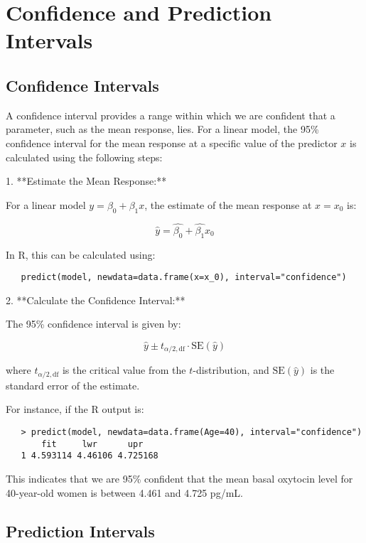 \documentclass{article}
\begin{document}
\section{Confidence and Prediction Intervals}

\subsection{Confidence Intervals}

A confidence interval provides a range within which we are confident that a parameter, such as the mean response, lies. For a linear model, the 95\% confidence interval for the mean response at a specific value of the predictor \(x\) is calculated using the following steps:

1. **Estimate the Mean Response:**

   For a linear model \( y = \beta_0 + \beta_1 x \), the estimate of the mean response at \( x = x_0 \) is:

   \[
   \hat{y} = \hat{\beta_0} + \hat{\beta_1} x_0
   \]

   In R, this can be calculated using:

   \begin{verbatim}
   predict(model, newdata=data.frame(x=x_0), interval="confidence")
   \end{verbatim}

2. **Calculate the Confidence Interval:**

   The 95\% confidence interval is given by:

   \[
   \hat{y} \pm t_{\alpha/2, \text{df}} \cdot \text{SE}(\hat{y})
   \]

   where \( t_{\alpha/2, \text{df}} \) is the critical value from the \( t \)-distribution, and \( \text{SE}(\hat{y}) \) is the standard error of the estimate.

   For instance, if the R output is:

   \begin{verbatim}
   > predict(model, newdata=data.frame(Age=40), interval="confidence")
       fit     lwr      upr
   1 4.593114 4.46106 4.725168
   \end{verbatim}

   This indicates that we are 95\% confident that the mean basal oxytocin level for 40-year-old women is between 4.461 and 4.725 pg/mL.

\subsection{Prediction Intervals}
\end{document}
